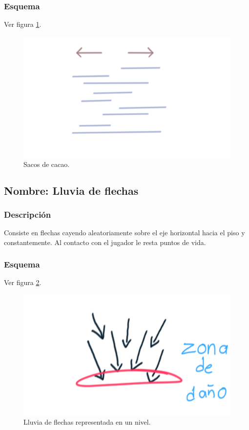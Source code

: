 \documentclass[11pt,letterpaper]{article}
\begin{document}
	\subsubsection{Esquema}
	Ver figura \ref{fig:vientoM}.
	\begin{figure}
		\centering
		\includegraphics[height=0.2 \textheight]{Imagenes/vientoM}
		\caption{Sacos de cacao.}
		\label{fig:vientoM}
	\end{figure}
		\subsection{Nombre: Lluvia de flechas}\label{obs.lluviaF}
	\subsubsection{Descripción}
	Consiste en flechas cayendo aleatoriamente sobre el eje horizontal hacia el piso y constantemente. Al contacto con el jugador le resta puntos de vida.
	\subsubsection{Esquema}
	Ver figura \ref{fig:lluviaF}.
	\begin{figure}
		\centering
		\includegraphics[height=0.2 \textheight]{Imagenes/lluviaF}
		\caption{Lluvia de flechas representada en un nivel.}
		\label{fig:lluviaF}
	\end{figure}
\end{document}
